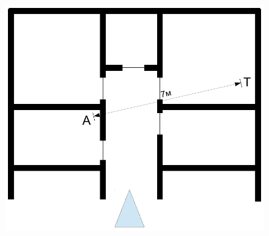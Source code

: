 \documentclass[a4paper,12pt,twoside,openright]{report}
\begin{document}
\begin{figure}[p]
\label{fig:practicalattack}
\captionsetup[subfigure]{labelformat=empty}
  \centering
\begin{minipage}[c][6cm][t]{.39\textwidth}
  \vspace*{\fill}
  \centering
  \includegraphics[width=\textwidth]{demo_floorplan}
\end{minipage}\par\vfill
\begin{minipage}[c][9cm][t]{.39\textwidth}
  \vspace*{\fill}
  \centering

\end{minipage}
\end{figure}
\end{document}
